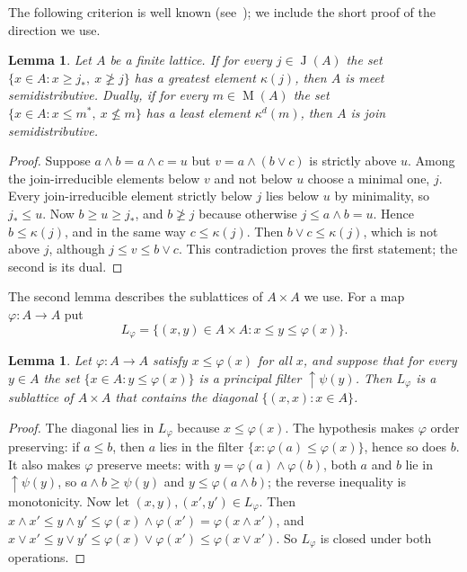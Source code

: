 \documentclass[11pt]{amsart}
\newtheorem{lemma}[theorem]{Lemma}
\theoremstyle{definition}
\theoremstyle{remark}
\numberwithin{equation}{section}
\newcommand{\Ji}{\operatorname{J}}
\newcommand{\Mi}{\operatorname{M}}
\newcommand{\up}{{\uparrow}}
\begin{document}
The following criterion is well known (see~\cite[Chapter~II]{FJN}); we include the short proof of the direction we use.

\begin{lemma}\label{lem:kappa}
Let $A$ be a finite lattice. If for every $j\in\Ji(A)$ the set $\{x\in A: x\ge j_*,\ x\not\ge j\}$ has a greatest element $\kappa(j)$, then $A$ is meet semidistributive. Dually, if for every $m\in\Mi(A)$ the set $\{x\in A: x\le m^*,\ x\not\le m\}$ has a least element $\kappa^d(m)$, then $A$ is join semidistributive.
\end{lemma}

\begin{proof}
Suppose $a\wedge b=a\wedge c=u$ but $v=a\wedge(b\vee c)$ is strictly above $u$. Among the join-irreducible elements below $v$ and not below $u$ choose a minimal one, $j$. Every join-irreducible element strictly below $j$ lies below $u$ by minimality, so $j_*\le u$. Now $b\ge u\ge j_*$, and $b\not\ge j$ because otherwise $j\le a\wedge b=u$. Hence $b\le\kappa(j)$, and in the same way $c\le\kappa(j)$. Then $b\vee c\le\kappa(j)$, which is not above $j$, although $j\le v\le b\vee c$. This contradiction proves the first statement; the second is its dual.
\end{proof}

The second lemma describes the sublattices of $A\times A$ we use. For a map $\varphi\colon A\to A$ put
\[
L_\varphi=\{(x,y)\in A\times A : x\le y\le\varphi(x)\}.
\]

\begin{lemma}\label{lem:Lphi}
Let $\varphi\colon A\to A$ satisfy $x\le\varphi(x)$ for all $x$, and suppose that for every $y\in A$ the set $\{x\in A:y\le\varphi(x)\}$ is a principal filter $\up\psi(y)$. Then $L_\varphi$ is a sublattice of $A\times A$ that contains the diagonal $\{(x,x):x\in A\}$.
\end{lemma}

\begin{proof}
The diagonal lies in $L_\varphi$ because $x\le\varphi(x)$. The hypothesis makes $\varphi$ order preserving: if $a\le b$, then $a$ lies in the filter $\{x:\varphi(a)\le\varphi(x)\}$, hence so does $b$. It also makes $\varphi$ preserve meets: with $y=\varphi(a)\wedge\varphi(b)$, both $a$ and $b$ lie in $\up\psi(y)$, so $a\wedge b\ge\psi(y)$ and $y\le\varphi(a\wedge b)$; the reverse inequality is monotonicity. Now let $(x,y),(x',y')\in L_\varphi$. Then $x\wedge x'\le y\wedge y'\le\varphi(x)\wedge\varphi(x')=\varphi(x\wedge x')$, and $x\vee x'\le y\vee y'\le\varphi(x)\vee\varphi(x')\le\varphi(x\vee x')$. So $L_\varphi$ is closed under both operations.
\end{proof}
\end{document}
